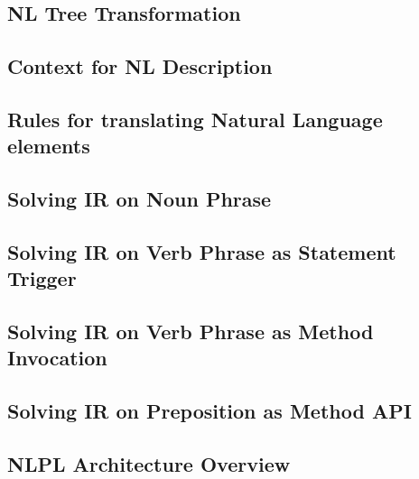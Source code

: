 \subsection{NL Tree Transformation}

\subsection{Context for NL Description}
\subsection{Rules for translating Natural Language elements}
\subsection{Solving IR on Noun Phrase}
\subsection{Solving IR on Verb Phrase as Statement Trigger}

\subsection{Solving IR on Verb Phrase as Method Invocation}
\subsection{Solving IR on Preposition as Method API}
\subsection{NLPL Architecture Overview}


